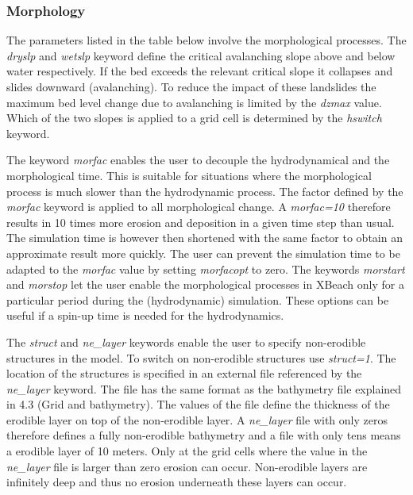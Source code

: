 \documentclass{article}
\begin{document}
\subsubsection{ Morphology}

\noindent The parameters listed in the table below involve the morphological processes. The \textit{dryslp} and \textit{wetslp} keyword define the critical avalanching slope above and below water respectively. If the bed exceeds the relevant critical slope it collapses and slides downward (avalanching). To reduce the impact of these landslides the maximum bed level change due to avalanching is limited by the \textit{dzmax} value. Which of the two slopes is applied to a grid cell is determined by the \textit{hswitch} keyword.

\noindent The keyword \textit{morfac} enables the user to decouple the hydrodynamical and the morphological time. This is suitable for situations where the morphological process is much slower than the hydrodynamic process. The factor defined by the \textit{morfac }keyword is applied to all morphological change. A \textit{morfac=10} therefore results in 10 times more erosion and deposition in a given time step than usual. The simulation time is however then shortened with the same factor to obtain an approximate result more quickly. The user can prevent the simulation time to be adapted to the \textit{morfac} value by setting \textit{morfacopt} to zero. The keywords \textit{morstart} and \textit{morstop} let the user enable the morphological processes in XBeach only for a particular period during the (hydrodynamic) simulation. These options can be useful if a spin-up time is needed for the hydrodynamics.

\noindent The \textit{struct }and \textit{ne\_layer} keywords enable the user to specify non-erodible structures in the model. To switch on non-erodible structures use \textit{struct=1}. The location of the structures is specified in an external file referenced by the \textit{ne\_layer }keyword. The file has the same format as the bathymetry file explained in 4.3 (Grid and bathymetry). The values of the file define the thickness of the erodible layer on top of the non-erodible layer. A \textit{ne\_layer} file with only zeros therefore defines a fully non-erodible bathymetry and a file with only tens means a erodible layer of 10 meters. Only at the grid cells where the value in the \textit{ne\_layer }file is larger than zero erosion can occur. Non-erodible layers are infinitely deep and thus no erosion underneath these layers can occur.
\end{document}
